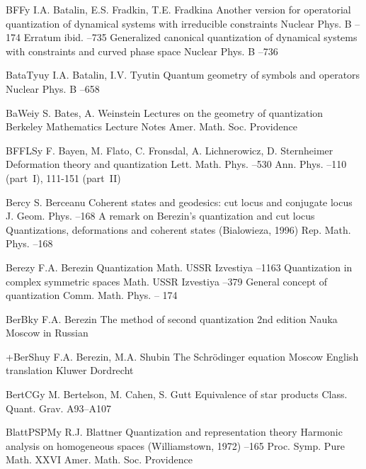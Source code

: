 \documentclass[12pt]{amsart}
\numberwithin{equation}{section}
\theoremstyle{remark}
\newcommand{\by}{\mathbf y}
\begin{document}
\begin{thebibliography}{199}
 BFF\by{ I.A. Batalin, E.S. Fradkin, T.E. Fradkina \paper Another version
for operatorial quantization of dynamical systems with irreducible constraints
\jour Nuclear Phys. B   --174 \moreref Erratum \jour
ibid.   --735 \moreref \paper Generalized canonical
quantization of dynamical systems with constraints and curved phase space \jour
Nuclear Phys. B   --736}

 BataTyu\by{ I.A. Batalin, I.V. Tyutin \paper Quantum geometry of symbols
and operators \jour Nuclear Phys. B   --658}

 BaWei\by{ S. Bates, A. Weinstein \book Lectures on the geometry of
quantization \bookinfo Berkeley Mathematics Lecture Notes  \publ Amer.
Math. Soc. \publaddr Providence }

 BFFLS\by{ F. Bayen, M. Flato, C. Fronsdal, A. Lichnerowicz, D.
Sternheimer \paper Deformation theory and quantization \jour Lett. Math.
Phys.   --530 \moreref \jour Ann. Phys. 
 --110 (part~I), 111-151 (part~II)}

 Berc\by{ S. Berceanu \paper Coherent states and geodesics: cut locus and
conjugate locus \jour J. Geom. Phys.   --168 \moreref
\paper A remark on Berezin's quantization and cut locus \inbook Quantizations,
deformations and coherent states (Bialowieza, 1996) \jour Rep. Math. Phys.
  --168}

 Berez\by{ F.A. Berezin \paper Quantization \jour Math. USSR Izvestiya
  --1163 \moreref \paper Quantization in complex
symmetric spaces \jour Math. USSR Izvestiya   --379
\moreref \paper General concept of quantization \jour Comm. Math. Phys.    -- 174}

 BerBk\by{ F.A. Berezin \book The method of second quantization \bookinfo
2nd edition \publ Nauka \publaddr Moscow  \lang in Russian}

 +BerShu\by{ F.A. Berezin, M.A. Shubin \book The Schr\"odinger equation
\publaddr Moscow  \transl English translation \publ Kluwer \publaddr
Dordrecht }

 BertCG\by{ M. Bertelson, M. Cahen, S. Gutt \paper Equivalence of star
products \jour Class. Quant. Grav.   \pages A93--A107}

 BlattPSPM\by{ R.J. Blattner \paper Quantization and representation theory
\inbook Harmonic analysis on homogeneous spaces (Will\-iams\-town, 1972) --165 \bookinfo Proc. Symp. Pure Math. \vol XXVI \publ Amer. Math. Soc.
\publaddr Providence }


\end{thebibliography}
\end{document}
